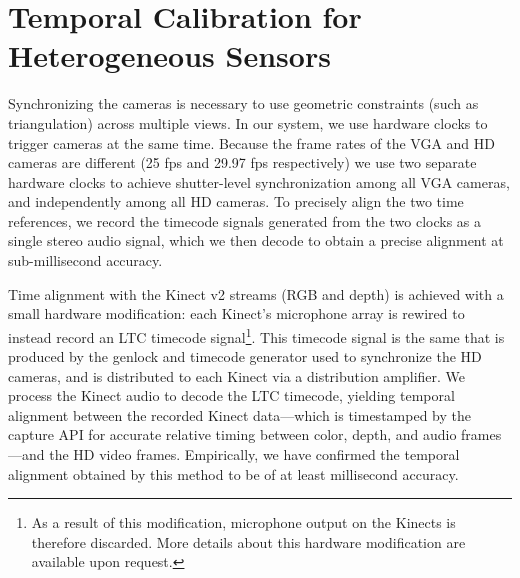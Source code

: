 \section{Temporal Calibration for Heterogeneous Sensors}
Synchronizing the cameras is necessary to use geometric constraints (such as triangulation) across multiple views. In our system, we use hardware clocks to trigger cameras at the same time. Because the frame rates of the VGA and HD cameras are different (25 fps and 29.97 fps respectively) we use two separate hardware clocks to achieve shutter-level synchronization among all VGA cameras, and independently among all HD cameras. To precisely align the two time references, we record the timecode signals generated from the two clocks as a single stereo audio signal, which we then decode to obtain a precise alignment at sub-millisecond accuracy. 

Time alignment with the Kinect v2 streams (RGB and depth) is achieved with a small hardware modification: each Kinect's microphone array is rewired to instead record an LTC timecode signal\footnote{As a result of this modification, microphone output on the Kinects is therefore discarded. More details about this hardware modification are available upon request.}.  This timecode signal is the same that is produced by the genlock and timecode generator used to synchronize the HD cameras, and is distributed to each Kinect via a distribution amplifier. We process the Kinect audio to decode the LTC timecode, yielding temporal alignment between the recorded Kinect data---which is timestamped by the capture API for accurate relative timing between color, depth, and audio frames---and the HD video frames. Empirically, we have confirmed the temporal alignment obtained by this method to be of at least millisecond accuracy.

